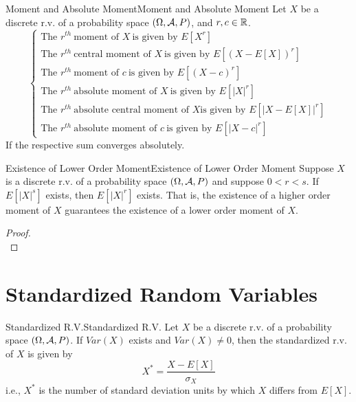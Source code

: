 \documentclass{elegantbook}
\begin{document}
\begin{definition}{Moment and Absolute Moment}{Moment and Absolute Moment}
Let $X$ be a discrete r.v. of a probability space $(\Omega,\mathcal{A}, P)$, and $r,c\in\mathbb{R}$.
$$\left\{
\begin{array}{l}
\text{The }r^{th}\ \text{moment of } X\ \text{is given by } E[X^r ]   \\                              
\text{The }r^{th}\ \text{central moment of } X\ \text{is given by } E[(X-E[X])^r]\\
\text{The }r^{th}\ \text{moment of } c\ \text{is given by } E[(X-c)^r ]      \\     
\text{The }r^{th}\ \text{absolute moment of } X\ \text{is given by } E[|X|^r ]\\
\text{The }r^{th}\ \text{absolute central moment of } X \text{is given by } E[|X-E[X] |^r]  \\
\text{The } r^{th}\ \text{absolute moment of } c\ \text{is given by } E[|X-c|^r ] 
\end{array}
\right.$$
If the respective sum converges absolutely.
\end{definition}

\begin{theorem}{Existence of Lower Order Moment}{Existence of Lower Order Moment}
Suppose $X$ is a discrete r.v. of a probability space $(\Omega,\mathcal{A}, P)$ and suppose $0<r<s$. If $E[|X|^s]$ exists, then $E[|X|^r]$ exists. That is, the existence of a higher order moment of $X$ guarantees the existence of a lower order moment of $X$.
\end{theorem}

\begin{proof}
\\[4cm]\vspace{0.01cm}
\end{proof}

\section{Standardized Random Variables}

\begin{definition}{Standardized R.V.}{Standardized R.V.}
Let $X$ be a discrete r.v. of a probability space $(\Omega,\mathcal{A}, P)$. If $Var(X)$ exists and $Var(X)\neq0$, then the standardized r.v. of $X$ is given by 
$$X^*=\frac{X-E[X]}{\sigma_X}$$
i.e., $X^*$ is the number of standard deviation units by which $X$ dif\/fers from $E[X]$.
\end{definition}
\end{document}
